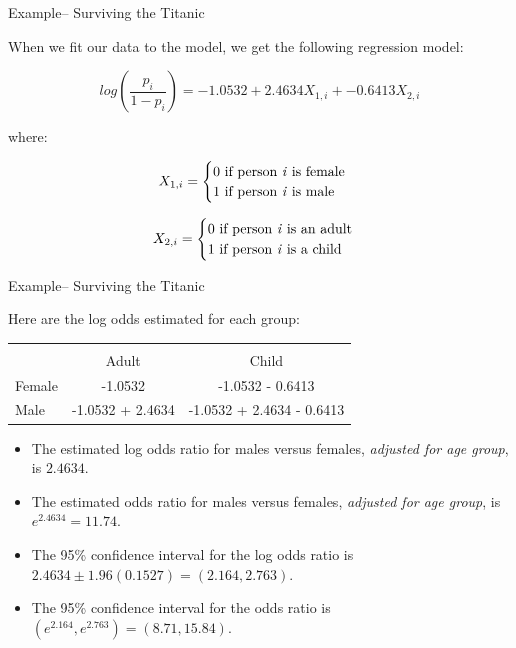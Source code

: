 \documentclass[ignorenonframetext,]{beamer}
\providecommand{\tightlist}{%
  \setlength{\itemsep}{0pt}\setlength{\parskip}{0pt}}
\begin{document}
\begin{frame}{Example-- Surviving the Titanic}

When we fit our data to the model, we get the following regression
model:

\[
log(\frac{p_i}{1 - p_i}) = -1.0532 + 2.4634X_{1,i} + -0.6413X_{2,i}
\]

where:

\begin{equation*}
    X_{1,i}=
    \begin{cases}
      0 \text{ if person \textit{i} is female} \\
      1 \text{ if person \textit{i} is male}
    \end{cases}
\end{equation*}

\begin{equation*}
    X_{2,i}=
    \begin{cases}
      0 \text{ if person \textit{i} is an adult} \\
      1 \text{ if person \textit{i} is a child}
    \end{cases}
\end{equation*}

\end{frame}

\begin{frame}{Example-- Surviving the Titanic}

Here are the log odds estimated for each group:

\centering

\begin{tabular}{lcc}
\toprule \\
 & Adult & Child \\
\midrule
Female & -1.0532 & -1.0532 - 0.6413 \\
Male   & -1.0532 + 2.4634 & -1.0532 + 2.4634 - 0.6413 \\
\bottomrule
\end{tabular}

\begin{itemize}
\tightlist
\item
  The estimated log odds ratio for males versus females, \emph{adjusted
  for age group}, is \(2.4634\).
\item
  The estimated odds ratio for males versus females, \emph{adjusted for
  age group}, is \(e^{2.4634} = 11.74\).
\item
  The 95\% confidence interval for the log odds ratio is
  \(2.4634 \pm 1.96(0.1527) = (2.164, 2.763)\).
\item
  The 95\% confidence interval for the odds ratio is
  \((e^{2.164}, e^{2.763}) = (8.71, 15.84)\).
\end{itemize}

\end{frame}
\end{document}
